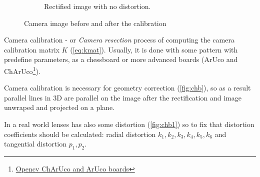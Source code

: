 \begin{figure}[!hp]
\begin{subfigure}[b]{0.45\textwidth}
      \caption{Rectified image with no distortion.}
      \label{fig:chb2}
    \end{subfigure}
    \caption{Camera image before and after the calibration}
    \label{fig:chb}
\end{figure}

Camera calibration - or \textit{Camera resection} process of computing the camera calibration matrix $K$ (\autoref{eq:kmat}).
Usually, it is done with some pattern with predefine parameters, as a chessboard or more advanced boards (ArUco and ChArUco\footnote{\href{https://docs.opencv.org/4.x/df/d4a/tutorial_charuco_detection.html}{Opencv ChArUco and ArUco boards}}).

Camera calibration is necessary for geometry correction (\autoref{fig:chb}), so as a result parallel lines in 3D are parallel on the image after the rectification and image unwraped and projected on a plane.

In a real world lenses has also some distortion (\autoref{fig:chb1}) so to fix that distortion coefficients should be calculated: radial distortion $k_1, k_2, k_3, k_4, k_5, k_6$ and tangential distortion $p_1, p_2$.

